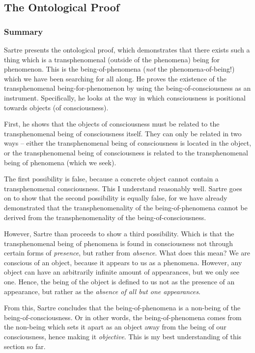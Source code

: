 \subsection{The Ontological Proof}
\subsubsection*{Summary}
Sartre presents the ontological proof, which demonstrates that there exists such a thing which is a transphenomenal (outside of the phenomena) being for phenomenon. This is the being-of-phenomena (\emph{not} the phenomena-of-being!) which we have been searching for all along. He proves the existence of the transphenomenal being-for-phenomenon by using the being-of-consciousness as an instrument. Specifically, he looks at the way in which consciousness is positional towards objects (of consciousness).

First, he shows that the objects of consciousness must be related to the transphenomenal being of consciousness itself. They can only be related in two ways -- either the transphenomenal being of consciousness is located in the object, or the transphenomenal being of consciousness is related to the transphenomenal being of phenomena (which we seek).

The first possibility is false, because a concrete object cannot contain a transphenomenal consciousness. This I understand reasonably well. Sartre goes on to show that the second possibility is equally false, for we have already demonstrated that the transphenomenality of the being-of-phenomena cannot be derived from the transphenomenality of the being-of-consciousness.

However, Sartre than proceeds to show a third possibility. Which is that the transphenomenal being of phenomena is found in consciousness not through certain forms of \emph{presence}, but rather from \emph{absence}. What does this mean? We are conscious of an object, because it appears to us as a phenomena. However, any object can have an arbitrarily infinite amount of appearances, but we only see one. Hence, the being of the object is defined to us not as the presence of an appearance, but rather as the \emph{absence of all but one appearances}.

From this, Sartre concludes that the being-of-phenomena is a non-being of the being-of-consciousness. Or in other words, the being-of-phenomena comes from the non-being which sets it apart as an object away from the being of our consciousness, hence making it \emph{objective}. This is my best understanding of this section so far.

